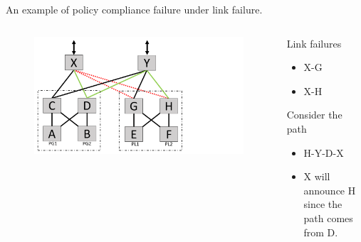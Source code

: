 \begin{frame}{An example of policy compliance failure under link failure.}
    \begin{columns}
        \begin{column}{0.45\textwidth}
            \begin{figure}
                \includegraphics[width=1\textwidth,keepaspectratio,clip,trim={0cm 0cm 9cm 0cm}]{figures/ex2_1_failed_links_new_path.pdf}
            \end{figure}
        \end{column}
        \begin{column}{0.50\textwidth}
            \begin{block}{Link failures}
                \begin{itemize}
                    \item X-G
                    \item X-H
                \end{itemize}
            \end{block}
            \begin{block}{Consider the path}
                \begin{itemize}
                    \item H-Y-D-X
                    \item X will announce H since the path comes from D.
                \end{itemize}
            \end{block}
        \end{column}
    \end{columns}
\end{frame}

